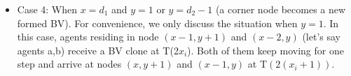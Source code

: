 \begin{itemize}
\item Case 4: When $x=d_1$ and $y=1$ or $y=d_2-1$ (a corner node becomes a new formed BV). For convenience, we only discuss the situation when $y=1$. In this case, agents residing in node $(x-1, y+1)$ and $(x-2, y)$ (let's say agents a,b) receive a BV clone at T(2$x_i$). Both of them keep moving for one step and arrive at nodes $(x, y+1)$ and $(x-1, y)$ at T$(2(x_i+1))$.
\begin{figure} [H]
  \centering 
 \hspace{1in} 
\subfigure[$T(2(x_i+2)+1)$]{ 
    \label{fig:subfigmesh4:d} %
}
\end{figure}
\end{itemize}
